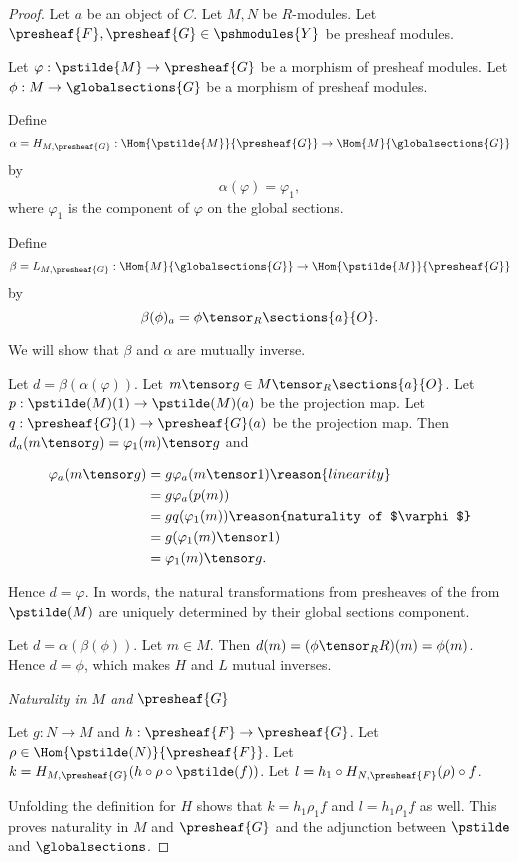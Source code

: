 
\begin{proof}
Let $a$ be an object of $C$.
Let $M,N$ be $R$-modules. 
Let $\presheaf{F},\presheaf{G} \in \pshmodules{Y}$ be presheaf modules.

Let $\varphi:\pstilde{M} \rightarrow \presheaf{G}$ be a morphism of presheaf modules.
Let $\phi: M \rightarrow \globalsections{G}$ be a morphism of presheaf modules.

Define 
\[\alpha = H_{M,\presheaf{G}}: 
	\Hom{\pstilde{M}}{\presheaf{G}} \rightarrow \Hom{M}{\globalsections{G}}
\]
by
\[ \alpha(\varphi) = \varphi_1,\]
where $\varphi_1$ is the component of $\varphi$ on the global sections.

Define 
\[\beta = L_{M,\presheaf{G}}: 
	\Hom{M}{\globalsections{G}} \rightarrow \Hom{\pstilde{M}}{\presheaf{G}}
\] 
by
\[ \beta(\phi)_a = \phi \tensor_R \sections{a}{O}.\]

We will show that $\beta$ and $\alpha$ are mutually inverse. 

Let $d = \beta(\alpha(\varphi))$. 
Let $m \tensor g \in M \tensor_R \sections{a}{O}$.
Let $p: \pstilde(M)(1)\rightarrow \pstilde(M)(a)$ be the projection map.
Let $q: \presheaf{G}(1)\rightarrow \presheaf{G}(a)$ be the projection map.
Then $d_a(m \tensor g) = \varphi_1(m) \tensor g$
and

\begin{align*}
	\varphi_a(m \tensor g) &=  g \varphi_a(m \tensor 1) \reason{linearity}\\
		&= g \varphi_a(p(m)) \\
		&= g q(\varphi_1(m)) \reason{naturality of $\varphi$}\\
		&= g (\varphi_1(m) \tensor 1) \\
		&= \varphi_1(m) \tensor g.
\end{align*}

Hence $d = \varphi$. 
In words, the natural transformations from presheaves of the from $\pstilde(M)$ 
are uniquely determined by their global sections component.

Let $d = \alpha(\beta(\phi))$. 
Let $m \in M$.
Then $d(m) = (\phi \tensor_R R)(m) = \phi(m)$.
Hence $d = \phi$, which makes $H$ and $L$ mutual inverses.

\textit{Naturality in $M$ and $\presheaf{G}$}

Let $g:N\rightarrow M$ and $h:\presheaf{F} \rightarrow \presheaf{G}$.
Let $\rho \in \Hom{\pstilde(N)}{\presheaf{F}}$.
Let $k = H_{M,\presheaf{G}} (h \circ \rho \circ \pstilde(f))$.
Let $l = h_1 \circ H_{N,\presheaf{F}}(\rho) \circ f$.

Unfolding the definition for $H$ shows that $k = h_1\rho_1 f$
and $l = h_1\rho_1 f$ as well.
This proves naturality in $M$ and $\presheaf{G}$ 
and the adjunction between $\pstilde$ and $\globalsections$.
\end{proof}
